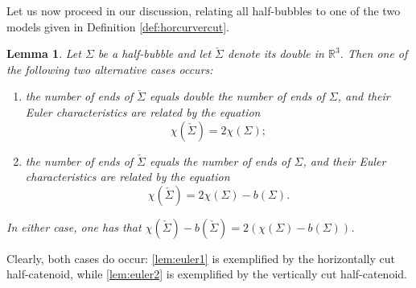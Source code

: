 \documentclass[10pt]{amsart}
\newcounter{cas}
\newtheorem{lem}[thm]{Lemma}
\theoremstyle{definition}
\newcommand{\R}{\mathbb{R}}
\begin{document}
Let us now proceed in our discussion, relating all half-bubbles to one of the two models given in Definition \ref{def:horcurvercut}.

\begin{lem}\label{lem:euler}
Let $\Sigma$ be a half-bubble and let $\check{\Sigma}$ denote its double in $\R^3$. Then one of the following two alternative cases occurs:
\begin{enumerate}
\item\label{lem:euler1}
the number of ends of $\check{\Sigma}$ equals double the number of ends of $\Sigma$, and their Euler characteristics are related by the equation
\[
\chi(\check{\Sigma})=2\chi(\Sigma);
\]

\item\label{lem:euler2}
the number of ends of $\check{\Sigma}$ equals the number of ends of $\Sigma$, and their Euler characteristics are related by the equation
\[
\chi(\check{\Sigma})=2\chi(\Sigma)-b(\Sigma).
\]
\end{enumerate}
In either case, one has that $\chi(\check{\Sigma})-b(\check{\Sigma})=2(\chi(\Sigma)-b(\Sigma))$.
\end{lem}

Clearly, both cases do occur: \eqref{lem:euler1} is exemplified by the horizontally cut half-catenoid, while \eqref{lem:euler2} is exemplified by the vertically cut half-catenoid.
\end{document}
